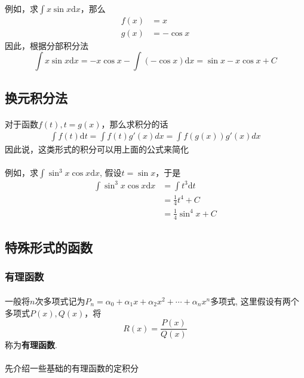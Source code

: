 \paragraph{}
例如，求$\int x \sin{x} \mathrm{d} x$，那么
\begin{align*}
f(x) & = x \\
g(x) &= -\cos{x}
\end{align*}
因此，根据分部积分法
$$
\int x \sin{x} \mathrm{d} x = - x \cos{x} - \int (-\cos{x}) \mathrm{d}x = \sin{x} - x \cos{x} + C
$$

\subsection{换元积分法}
\paragraph{}
对于函数$f(t), t = g(x)$，那么求积分的话
\begin{align*}
\int f(t) \mathrm{d}t  = \int f(t) g'(x) dx = \int f(g(x)) g'(x) dx
\end{align*}
因此说，这类形式的积分可以用上面的公式来简化

\paragraph{}
例如，求$\int \sin^3{x} \cos{x} \mathrm{d}x$, 假设$t = \sin{x}$，于是
\begin{align*}
\int \sin^3{x} \cos{x} \mathrm{d} x & = \int t^3 \mathrm{d}t \\
& = \frac{1}{4}t^4 + C \\
& = \frac{1}{4} \sin^4{x} + C
\end{align*}

\subsection{特殊形式的函数}
\subsubsection{有理函数}
\paragraph{}
一般将$n$次多项式记为$P_n = \alpha_0 + \alpha_1 x + \alpha_2 x^2 + \cdots + \alpha_n x^n$多项式, 这里假设有两个多项式$P(x), Q(x)$，将
$$
R(x) = \frac{P(x)}{Q(x)}
$$
称为\textbf{有理函数}. 

\paragraph{}
先介绍一些基础的有理函数的定积分

